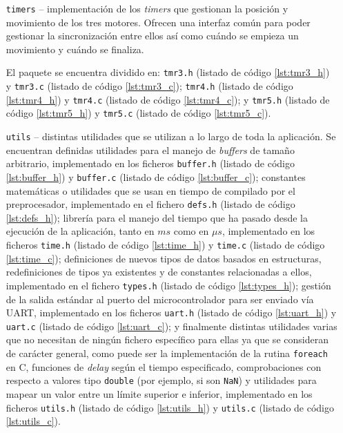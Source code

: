 \begin{itemize}
    \item[\texttt{timers} --] implementación de los \textit{timers} que
    gestionan la posición y movimiento de los tres motores. Ofrecen una
    interfaz común para poder gestionar la sincronización entre ellos así
    como cuándo se empieza un movimiento y cuándo se finaliza.

    El paquete se encuentra dividido en: \texttt{tmr3.h} (listado de código
    \ref{lst:tmr3_h}) y \texttt{tmr3.c} (listado de código \ref{lst:tmr3_c});
    \texttt{tmr4.h} (listado de código \ref{lst:tmr4_h}) y \texttt{tmr4.c}
    (listado de código \ref{lst:tmr4_c}); y \texttt{tmr5.h} (listado de código
    \ref{lst:tmr5_h}) y \texttt{tmr5.c} (listado de código \ref{lst:tmr5_c}).

    \item[\texttt{utils} --] distintas utilidades que se utilizan a lo largo
    de toda la aplicación. Se encuentran definidas utilidades para el manejo
    de \textit{buffers} de tamaño arbitrario, implementado en los ficheros
    \texttt{buffer.h} (listado de código \ref{lst:buffer_h}) y \texttt{buffer.c}
    (listado de código \ref{lst:buffer_c}); constantes matemáticas o 
    utilidades que se usan en tiempo de compilado por el preprocesador, 
    implementado en el fichero \texttt{defs.h}
    (listado de código \ref{lst:defs_h}); librería para el manejo del tiempo
    que ha pasado desde la ejecución de la aplicación, tanto en $ms$ como en
    $\mu s$, implementado en los ficheros \texttt{time.h} (listado de código
    \ref{lst:time_h}) y \texttt{time.c} (listado de código \ref{lst:time_c});
    definiciones de nuevos tipos de datos basados en estructuras, redefiniciones
    de tipos ya existentes y de constantes relacionadas a ellos, implementado en
    el fichero \texttt{types.h} (listado de código \ref{lst:types_h}); gestión
    de la salida estándar al puerto del microcontrolador para ser enviado vía
    \ac{UART}, implementado en los ficheros \texttt{uart.h} (listado de código
    \ref{lst:uart_h}) y \texttt{uart.c} (listado de código \ref{lst:uart_c});
    y finalmente distintas utilidades varias que no necesitan de ningún fichero
    específico para ellas ya que se consideran de carácter general, como puede
    ser la implementación de la rutina \texttt{foreach} en C, funciones de
    \textit{delay} según el tiempo especificado, comprobaciones con respecto
    a valores tipo \texttt{double} (por ejemplo, si son \texttt{NaN}) y utilidades
    para mapear un valor entre un límite superior e inferior, implementado en los
    ficheros \texttt{utils.h} (listado de código \ref{lst:utils_h}) y \texttt{utils.c}
    (listado de código \ref{lst:utils_c}).


\end{itemize}
